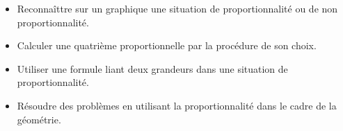 

\begin{prerequis}[Objectifs de 4\up{e}]
    \begin{itemize}        
        \item Reconnaîttre sur un graphique une situation de proportionnalité ou de non proportionnalité.
        \item Calculer une quatrième proportionnelle par la procédure de son choix.
        \item Utiliser une formule liant deux grandeurs dans une situation de proportionnalité.
        \item Résoudre des problèmes en utilisant la proportionnalité dans le cadre de la géométrie.
    \end{itemize}
\end{prerequis}
